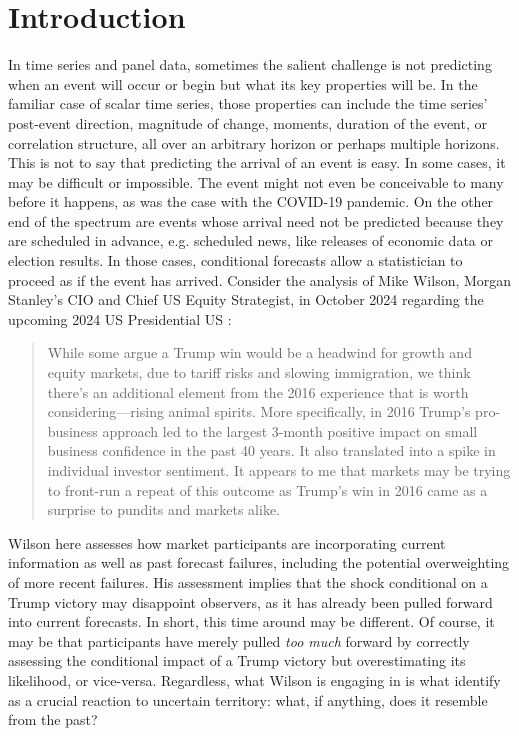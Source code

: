 \documentclass{uiucthesis2021}
\theoremstyle{definition}
\begin{document}
  \section{Introduction}\label{Introduction}

  In time series and panel data, sometimes the salient challenge is not predicting when an event will occur or begin but what its key properties will be.  In the familiar case of scalar time series, those properties can include the time series' post-event direction, magnitude of change, moments, duration of the event, or correlation structure, all over an arbitrary horizon or perhaps multiple horizons. This is not to say that predicting the arrival of an event is easy. In some cases, it may be difficult or impossible.  The event might not even be conceivable to many before it happens, as was the case with the COVID-19 pandemic.  On the other end of the spectrum are events whose arrival need not be predicted because they are scheduled in advance, e.g. scheduled news, like releases of economic data or election results.  In those cases, conditional forecasts allow a statistician to proceed as if the event has arrived.  Consider the analysis of Mike Wilson, Morgan Stanley’s CIO and Chief US Equity  Strategist, in October 2024 regarding the upcoming 2024 US Presidential US \parencite[][]{thoughts_on_market}:

  
  \begin{quote}While some argue a Trump win would be a headwind for growth and equity markets, due to tariff  risks and slowing immigration, we think there's an additional element from the 2016 experience that  is worth considering—rising animal spirits. More specifically, in 2016 Trump's pro-business approach  led to the largest 3-month positive impact on small business confidence in the past 40 years. It also translated into a spike in individual investor sentiment. It appears to me that markets may be trying  to front-run a repeat of this outcome as Trump's win in 2016 came as a surprise to pundits and  markets alike.
  \end{quote}
  Wilson here assesses how market participants are incorporating current information as well as past forecast failures, including the potential overweighting of more recent failures.  His assessment implies that the shock conditional on a Trump victory may disappoint observers, as it has already been pulled forward into current forecasts.  In short, this time around may be different.  Of course, it may be that participants have merely pulled \textit{too much} forward by correctly assessing the conditional impact of a Trump victory but overestimating its likelihood, or vice-versa.  Regardless, what Wilson is engaging in is what \cite[][]{lundquist2024volatility} identify as a crucial reaction to uncertain territory: what, if anything, does it resemble from the past?
  
\end{document}
